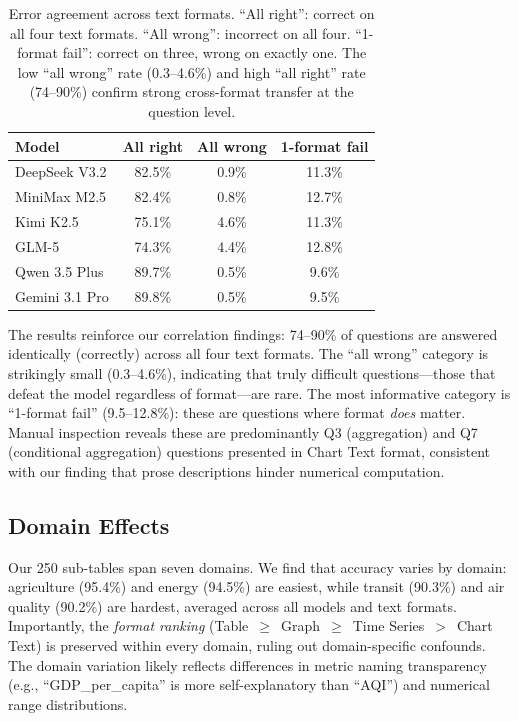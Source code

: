\documentclass[11pt]{article}
\begin{document}
\begin{table}[t]
\centering
\small
\begin{tabular}{lccc}
\toprule
\textbf{Model} & \textbf{All right} & \textbf{All wrong} & \textbf{1-format fail} \\
\midrule
DeepSeek V3.2 & 82.5\% & 0.9\% & 11.3\% \\
MiniMax M2.5 & 82.4\% & 0.8\% & 12.7\% \\
Kimi K2.5 & 75.1\% & 4.6\% & 11.3\% \\
GLM-5 & 74.3\% & 4.4\% & 12.8\% \\
Qwen 3.5 Plus & 89.7\% & 0.5\% & 9.6\% \\
Gemini 3.1 Pro & 89.8\% & 0.5\% & 9.5\% \\
\bottomrule
\end{tabular}
\caption{Error agreement across text formats. ``All right'': correct on all four text formats. ``All wrong'': incorrect on all four. ``1-format fail'': correct on three, wrong on exactly one. The low ``all wrong'' rate (0.3--4.6\%) and high ``all right'' rate (74--90\%) confirm strong cross-format transfer at the question level.}
\label{tab:error_agree}
\end{table}

The results reinforce our correlation findings: 74--90\% of questions are answered identically (correctly) across all four text formats. The ``all wrong'' category is strikingly small (0.3--4.6\%), indicating that truly difficult questions---those that defeat the model regardless of format---are rare. The most informative category is ``1-format fail'' (9.5--12.8\%): these are questions where format \emph{does} matter. Manual inspection reveals these are predominantly Q3 (aggregation) and Q7 (conditional aggregation) questions presented in Chart Text format, consistent with our finding that prose descriptions hinder numerical computation.

\subsection{Domain Effects}

Our 250 sub-tables span seven domains. We find that accuracy varies by domain: agriculture (95.4\%) and energy (94.5\%) are easiest, while transit (90.3\%) and air quality (90.2\%) are hardest, averaged across all models and text formats. Importantly, the \emph{format ranking} (Table~$\geq$~Graph~$\geq$~Time Series~$>$~Chart Text) is preserved within every domain, ruling out domain-specific confounds. The domain variation likely reflects differences in metric naming transparency (e.g., ``GDP\_per\_capita'' is more self-explanatory than ``AQI'') and numerical range distributions.
\end{document}
